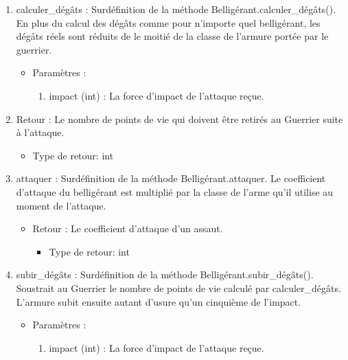 \documentclass[12pt,pdftex,oneside]{article}
\begin{document}
\begin{itemize}
    \begin{enumerate}
    \item calculer\_dégâts : Surdéfinition de la méthode
      Belligérant.calculer\_dégâts(). En plus du calcul des dégâts comme pour
      n'importe quel belligérant, les dégâts réels sont réduits de le moitié de
      la classe de l'armure portée par le guerrier.
      \begin{itemize}
      \item Paramètres : 
        \begin{enumerate}
        \item impact (int) : La force d'impact de l'attaque reçue.
        \end{enumerate}
      \end{itemize}
      \item Retour : Le nombre de points de vie qui doivent être retirés au
        Guerrier suite à l'attaque.
          \begin{itemize}
          \item Type de retour: int
          \end{itemize}

    \item attaquer : Surdéfinition de la méthode Belligérant.attaquer. Le
      coefficient d'attaque du belligérant est multiplié par la classe de l'arme
      qu'il utilise au moment de l'attaque.
      \begin{itemize}
      \item Retour : Le coefficient d'attaque d'un assaut.
          \begin{itemize}
          \item Type de retour: int
          \end{itemize}
      \end{itemize}

    \item subir\_dégâts : Surdéfinition de la méthode
      Belligérant.subir\_dégâts(). Soustrait au Guerrier le nombre de points de
      vie calculé par calculer\_dégâts. L'armure subit ensuite autant
      d'usure qu'un cinquième de l'impact.
      \begin{itemize}
      \item Paramètres : 
        \begin{enumerate}
        \item impact (int) : La force d'impact de l'attaque reçue.
        \end{enumerate}
      \end{itemize}
    \end{enumerate}

  \end{itemize}
\end{document}
